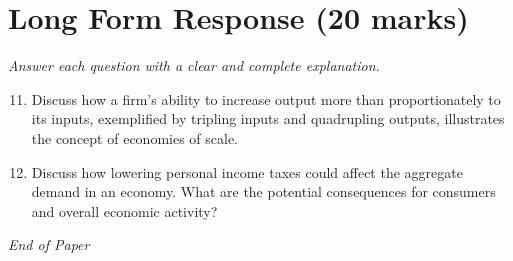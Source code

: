 \documentclass[12pt]{article}
\begin{document}
\section*{Long Form Response (20 marks)}
\textit{Answer each question with a clear and complete explanation.}
\begin{enumerate}[label=\arabic*.]
\setcounter{enumi}{10}
\item Discuss how a firm's ability to increase output more than proportionately to its inputs, exemplified by tripling inputs and quadrupling outputs, illustrates the concept of economies of scale.
\item Discuss how lowering personal income taxes could affect the aggregate demand in an economy. What are the potential consequences for consumers and overall economic activity?
\end{enumerate}

\vfill
\noindent\textit{End of Paper}
\end{document}

